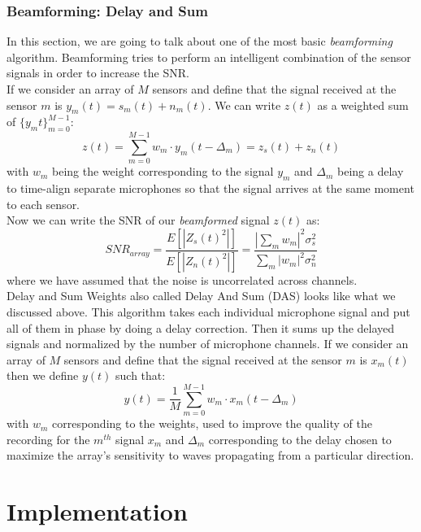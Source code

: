 \documentclass[11pt,a4paper,titlepage]{report}
\begin{document}
\subsection{Beamforming: Delay and Sum}
\hspace*{0.6cm}
In this section, we are going to talk about one of the most basic \emph{beamforming} algorithm\cite{BEAM}. Beamforming tries to perform an intelligent combination of the sensor signals in order to increase the SNR.\\
If we consider an array of $ M $ sensors and define that the signal received at the sensor $ m $ is $ y_{m}(t) = s_{m}(t) + n_{m}(t) $. We can write $ z(t) $ as a weighted sum of $ \{y_m{t}\}_{m=0}^{M-1} $:
\begin{equation}
z(t) = \sum_{m=0}^{M-1}{w_{m} \cdot y_{m}(t-\Delta_{m})} = z_{s}(t) + z_{n}(t) 
\end{equation}
with $ w_{m} $ being the weight corresponding to the signal $ y_{m} $ and $\Delta_{m}$ being a delay to time-align separate microphones so that the signal arrives at the same moment to each sensor.\\
Now we can write the SNR of our \emph{beamformed} signal $z(t) $ as:
\begin{equation}
SNR_{array} = \dfrac{E[|Z_{s}(t)^2|]}{E[|Z_{n}(t)^2|]} = \dfrac{|\sum_{m}w_{m}|^2 \sigma_{s}^2} {\sum_{m}|w_{m}|^2 \sigma_{n}^2} 
\end{equation}
where we have assumed that the noise is uncorrelated across channels.\\
Delay and Sum Weights also called Delay And Sum (DAS) looks like what we discussed above. This algorithm takes each individual microphone signal and put all of them in phase by doing a delay correction. Then it sums up the delayed signals and normalized by the number of microphone channels.
If we consider an array of $ M $ sensors and define that the signal received at the sensor $ m $ is $x_m(t)$ then we define $ y(t) $ such that:
\begin{equation}
y(t) = \frac{1}{M}\sum_{m=0}^{M-1}{w_{m}\cdot x_{m}(t-\Delta_{m})}
\end{equation}
with $ w_{m} $ corresponding to the weights, used to improve the quality of the recording for the $ m^{th} $ signal $ x_{m}  $ and $\Delta_{m}$ corresponding to the delay chosen to maximize the array's sensitivity to waves propagating from a particular direction.

\chapter{Implementation}
\end{document}

